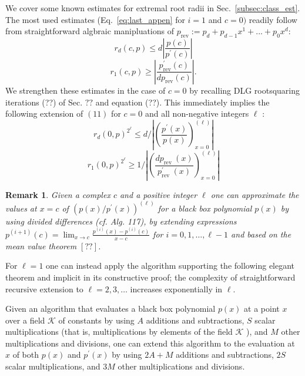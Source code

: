 \documentclass[sigconf]{acmart}
\newtheorem{remark}{Remark}
\begin{document}
We cover some known estimates for extremal root radii in Sec.~\ref{subsec:class_est}. The most used estimates (Eq.~\ref{eq:last_appen} for $i=1$ and $c=0)$ readily follow from straightforward algbraic manipluations of $p_\text{rev}:=p_d+p_{d-1}x^1+...+p_0x^d$:
\begin{equation}\label{eq:rat_roo_radii_1}
r_{d}(c, p) \leq d\left|\frac{p(c)}{p^{\prime}(c)}\right|
\end{equation}
\begin{equation}\label{eq:rat_roo_radii_2}
 r_{1}(c, p) \geq\left|\frac{p_{\mathrm{rev}}^{\prime}(c)}{d p_{\mathrm{rev}}(c)}\right| .
\end{equation}
We strengthen these estimates in the case of $c=0$ by recalling DLG rootsquaring iterations (??) of Sec. $??$ and equation (??). This immediately implies the following extension of $(11)$ for $c=0$ and all non-negative integers $\ell$ :
\begin{equation}\label{eq:rat_roo_radii_3}
r_{d}(0, p)^{2^{\ell}} \leq d /\left|\left(\frac{p^{\prime}(x)}{p(x)}\right)_{x=0}^{(\ell)}\right|
\end{equation}
\begin{equation}\label{eq:rat_roo_radii_4}
r_{1}(0, p)^{2^{\ell}} \geq 1 /\left|\left(\frac{d p_{\text {rev }}(x)}{p_{\text {rev }}^{\prime}(x)}\right)_{x=0}^{(\ell)}\right|
\end{equation}
\begin{remark}\label{rem:fin_diff}
 Given a complex $c$ and a positive integer $\ell$ one can approximate the values at $x=c$ of $\left(p(x) / p^{\prime}(x)\right)^{(\ell)}$ for a black box polynomial $p(x)$ by using divided differences (cf. Alg. 117), by extending expressions $p^{(i+1)}(c)=\lim _{x \rightarrow c} \frac{p^{(i)}(x)-p^{(i)}(c)}{x-c}$ for $i=0,1, \ldots, \ell-1$ and based on the mean value theorem $[??]$.
\end{remark}

For $\ell=1$ one can instead apply the algorithm supporting the following elegant theorem and implicit in its constructive proof; the complexity of straightforward recursive extension to $\ell=2,3, \ldots$ increases exponentially in $\ell$.

\begin{theorem}
Given an algorithm that evaluates a black box polynomial $p(x)$ at a point $x$ over a field $\mathcal{K}$ of constants by using $A$ additions and subtractions, $S$ scalar multiplications (that is, multiplications by elements of the field $\mathcal{K}$ ), and $M$ other multiplications and divisions, one can extend this algorithm to the evaluation at $x$ of both $p(x)$ and $p^{\prime}(x)$ by using $2 A+M$ additions and subtractions, $2 S$ scalar multiplications, and $3 M$ other multiplications and divisions.
\end{theorem}
\end{document}
